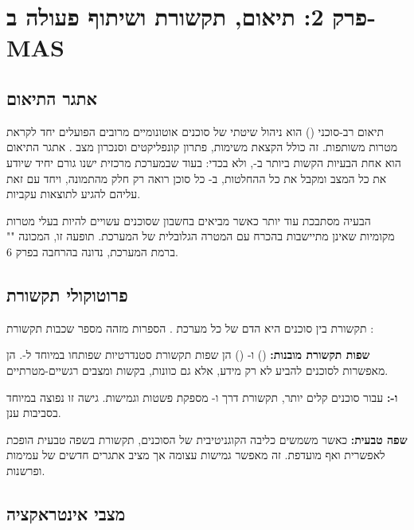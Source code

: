 \documentclass[12pt,a4paper]{article}
\begin{document}
\section{פרק 2: תיאום, תקשורת ושיתוף פעולה ב-MAS}

\subsection{אתגר התיאום}

תיאום רב-סוכני () הוא ניהול שיטתי של סוכנים אוטונומיים מרובים הפועלים יחד לקראת מטרות משותפות. זה כולל הקצאת משימות, פתרון קונפליקטים וסנכרון מצב \cite{Galileo2025}. אתגר התיאום הוא אחת הבעיות הקשות ביותר ב-, ולא בכדי: בעוד שבמערכת מרכזית ישנו גורם יחיד שיודע את כל המצב ומקבל את כל ההחלטות, ב- כל סוכן רואה רק חלק מהתמונה, ויחד עם זאת עליהם להגיע לתוצאות עקביות.

הבעיה מסתבכת עוד יותר כאשר מביאים בחשבון שסוכנים עשויים להיות בעלי מטרות מקומיות שאינן מתיישבות בהכרח עם המטרה הגלובלית של המערכת. תופעה זו, המכונה "" ברמת המערכת, נדונה בהרחבה בפרק 6.

\subsection{פרוטוקולי תקשורת}

תקשורת בין סוכנים היא הדם של כל מערכת . הספרות מזהה מספר שכבות תקשורת \cite{LinkedIn_Sharda2025}:

\textbf{שפות תקשורת מובנות:}  () ו- () הן שפות תקשורת סטנדרטיות שפותחו במיוחד ל-. הן מאפשרות לסוכנים להביע לא רק מידע, אלא גם כוונות, בקשות ומצבים רגשיים-מטרתיים.

\textbf{ ו-:} עבור סוכנים קלים יותר, תקשורת דרך  ו- מספקת פשטות וגמישות. גישה זו נפוצה במיוחד בסביבות ענן.

\textbf{שפה טבעית:} כאשר  משמשים כליבה הקוגניטיבית של הסוכנים, תקשורת בשפה טבעית הופכת לאפשרית ואף מועדפת. זה מאפשר גמישות עצומה אך מציב אתגרים חדשים של עמימות ופרשנות.

\subsection{מצבי אינטראקציה}
\end{document}
